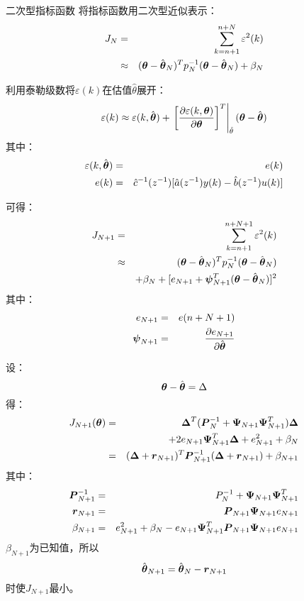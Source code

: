 \begin{frame}{二次型指标函数}
将指标函数用二次型近似表示：
\begin{eqnarray*}
J_N &=& \sum_{k=n+1}^{n+N}\varepsilon^2(k)\\
&\approx & (\boldsymbol{\theta}-\hat{\boldsymbol{\theta}}_N)^Tp^{-1}_N(\boldsymbol{\theta}-\hat{\boldsymbol{\theta}}_N)+\beta_N\\
\end{eqnarray*}
\end{frame}

\begin{frame}
利用泰勒级数将$\varepsilon(k)$在估值$\hat\theta$展开：
$$
\varepsilon(k)\approx \varepsilon(k,\hat{\boldsymbol{\theta}})+\left.\left[\frac{\partial \varepsilon(k,\boldsymbol{\theta})}{\partial\boldsymbol{\theta}}\right]^T\right|_{\hat\theta}(\boldsymbol{\theta}-\hat{\boldsymbol{\theta}})
$$
其中：
\begin{eqnarray*}
\varepsilon(k,\hat{\boldsymbol{\theta}}) &=& e(k) \\
e(k) &=& \hat c^{-1}(z^{-1})[\hat a(z^{-1})y(k)-\hat b(z^{-1})u(k)]
\end{eqnarray*}
\end{frame}

\begin{frame}
可得：
\begin{eqnarray*}
J_{N+1} &=& \sum_{k=n+1}^{n+N+1}\varepsilon^2(k) \\
&\approx & (\boldsymbol{\theta}-\hat{\boldsymbol{\theta}}_N)^Tp^{-1}_N(\boldsymbol{\theta}-\hat{\boldsymbol{\theta}}_N) \\
&&+\beta_N+[e_{N+1}+\boldsymbol{\psi}^T_{N+1}(\boldsymbol{\theta}-\hat{\boldsymbol{\theta}}_N)]^2 
\end{eqnarray*}
其中：
\begin{eqnarray*}
e_{N+1} &=& e(n+N+1) \\
\boldsymbol{\psi}_{N+1} &=& \frac{\partial e_{N+1}}{\partial\hat{\boldsymbol{\theta}}}
\end{eqnarray*}
\end{frame}

\begin{frame}
设：
$$\boldsymbol{\theta}-\hat{\boldsymbol{\theta}}=\Delta$$
得：
\begin{eqnarray*}
J_{N+1}(\boldsymbol{\theta}) &=& \boldsymbol{\Delta}^T(\boldsymbol{P}_N^{-1} +\boldsymbol{\Psi}_{N+1}\boldsymbol{\Psi}_{N+1}^T)\boldsymbol{\Delta} \\
&& +2e_{N+1}\boldsymbol{\Psi}^T_{N+1}\boldsymbol{\Delta}+e^2_{N+1}+\beta_N \\
 &=& (\boldsymbol{\Delta}+\boldsymbol{r}_{N+1})^T\boldsymbol{P}_{N+1}^{-1}(\boldsymbol{\Delta}+\boldsymbol{r}_{N+1})+\beta_{N+1}
\end{eqnarray*}
其中：
\begin{eqnarray*}
\boldsymbol{P}_{N+1}^{-1} &=& P_N^{-1}+\boldsymbol{\Psi}_{N+1}\boldsymbol{\Psi}_{N+1}^T  \\
\boldsymbol{r}_{N+1} &=& \boldsymbol{P}_{N+1}\boldsymbol{\Psi}_{N+1}e_{N+1} \\
\beta_{N+1} &=& e_{N+1}^2+\beta_N-e_{N+1}\boldsymbol{\Psi}_{N+1}^T\boldsymbol{P}_{N+1}\boldsymbol{\Psi}_{N+1}e_{N+1}
\end{eqnarray*}
$\beta_{N+1}$为已知值，所以
$$
\hat{\boldsymbol{\theta}}_{N+1}=\hat{\boldsymbol{\theta}}_N-\boldsymbol{r}_{N+1}
$$
时使$J_{N+1}$最小。
\end{frame}

